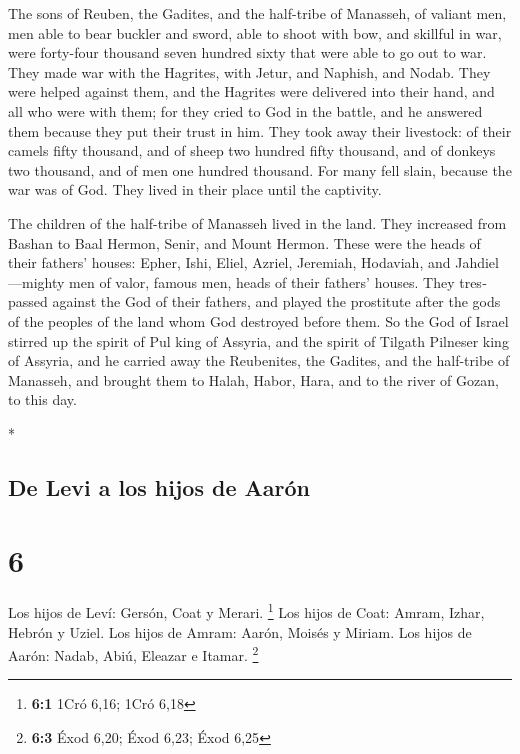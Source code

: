 \begin{paracol}{2}
\begin{otherlanguage}{english}
 The sons of Reuben, the Gadites, and the half-tribe of
Manasseh, of valiant men, men able to bear buckler and sword, able to
shoot with bow, and skillful in war, were forty-four thousand seven
hundred sixty that were able to go out to war.  They made
war with the Hagrites, with Jetur, and Naphish, and Nodab.
 They were helped against them, and the Hagrites were
delivered into their hand, and all who were with them; for they cried to
God in the battle, and he answered them because they put their trust in
him.  They took away their livestock: of their camels
fifty thousand, and of sheep two hundred fifty thousand, and of donkeys
two thousand, and of men one hundred thousand.  For many
fell slain, because the war was of God. They lived in their place until
the captivity.

 The children of the half-tribe of Manasseh lived in the
land. They increased from Bashan to Baal Hermon, Senir, and Mount
Hermon.  These were the heads of their fathers' houses:
Epher, Ishi, Eliel, Azriel, Jeremiah, Hodaviah, and Jahdiel---mighty men
of valor, famous men, heads of their fathers' houses. 
They trespassed against the God of their fathers, and played the
prostitute after the gods of the peoples of the land whom God destroyed
before them.  So the God of Israel stirred up the spirit
of Pul king of Assyria, and the spirit of Tilgath Pilneser king of
Assyria, and he carried away the Reubenites, the Gadites, and the
half-tribe of Manasseh, and brought them to Halah, Habor, Hara, and to
the river of Gozan, to this day.

\end{otherlanguage}

\switchcolumn[0]*

\hypertarget{de-levi-a-los-hijos-de-aaruxf3n}{%
\subsection{De Levi a los hijos de
Aarón}\label{de-levi-a-los-hijos-de-aaruxf3n}}

\hypertarget{section-10}{%
\section{6}\label{section-10}}

 Los hijos de Leví: Gersón, Coat y Merari. \footnote{\textbf{6:1}
  1Cró 6,16; 1Cró 6,18}  Los hijos de Coat: Amram, Izhar,
Hebrón y Uziel.  Los hijos de Amram: Aarón, Moisés y
Miriam. Los hijos de Aarón: Nadab, Abiú, Eleazar e Itamar. \footnote{\textbf{6:3}
  Éxod 6,20; Éxod 6,23; Éxod 6,25}


\end{paracol}
